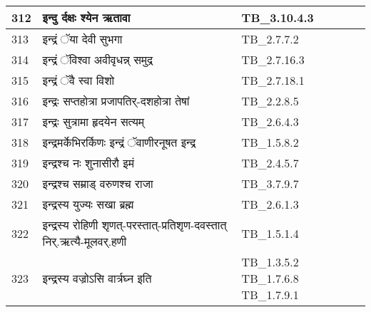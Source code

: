 \documentclass[17pt]{extarticle}
\begin{document}
\begin{longtable}{||p{0.4in}||p{4.9in}||p{0.9in}||}
    \hline
        
    312 & इन्दु र्दक्षः श्येन ऋतावा & TB\_3.10.4.3       \\
    
    \hline
        
    313 & इन्द्रं ॅया देवी सुभगा & TB\_2.7.7.2       \\
    
    \hline
        
    314 & इन्द्रं ॅविश्वा अवीवृधन्न् समुद्र & TB\_2.7.16.3       \\
    
    \hline
        
    315 & इन्द्रं ॅवै स्वा विशो & TB\_2.7.18.1       \\
    
    \hline
        
    316 & इन्द्रः सप्तहोत्रा प्रजापतिर्{-}दशहोत्रा तेषां & TB\_2.2.8.5       \\
    
    \hline
        
    317 & इन्द्रः सुत्रामा हृदयेन सत्यम् & TB\_2.6.4.3       \\
    
    \hline
        
    318 & इन्द्रमर्केभिरर्किणः इन्द्रं ॅवाणीरनूषत इन्द्र & TB\_1.5.8.2       \\
    
    \hline
        
    319 & इन्द्रश्च नः शुनासीरौ इमं & TB\_2.4.5.7       \\
    
    \hline
        
    320 & इन्द्रश्च सम्राड् वरुणश्च राजा & TB\_3.7.9.7       \\
    
    \hline
        
    321 & इन्द्रस्य युज्यः सखा ब्रह्म & TB\_2.6.1.3       \\
    
    \hline
        
    322 & इन्द्रस्य रोहिणी शृणत्{-}परस्तात्{-}प्रतिशृण{-}दवस्तात् निर्.ऋत्यै{-}मूलवर्.हणी & TB\_1.5.1.4       \\
    
    \hline
        
    323 & इन्द्रस्य वज्रोऽसि वार्त्रघ्न इति & TB\_1.3.5.2 TB\_1.7.6.8 TB\_1.7.9.1       \\
    
    \hline
        

\end{longtable}
\end{document}
